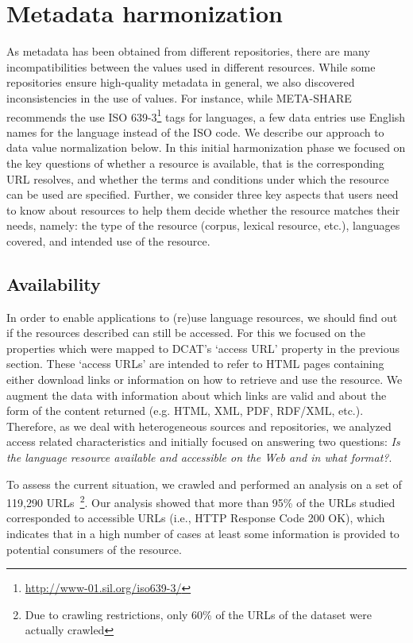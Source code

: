 \documentclass[11pt]{article}
\begin{document}
\section{Metadata harmonization}

\label{harmonization}

As metadata has been obtained from different repositories, there are many incompatibilities between the values used in different resources. 
While some repositories ensure high-quality metadata in general, we also
discovered inconsistencies in the use of values. For instance, while META-SHARE
recommends the use ISO 639-3\footnote{\url{http://www-01.sil.org/iso639-3/}} tags for
languages, a few data entries use English names for the language
instead of the ISO code. We describe our approach to data value normalization below. In this initial harmonization phase we focused on the key
questions of whether a resource is available, that is the corresponding URL resolves, and whether the terms and conditions under which the resource can be used are specified. Further, we consider three key aspects that users need to know about resources to help them decide whether the resource matches their needs, namely: the type of the resource (corpus, lexical resource, etc.), languages covered, and intended use of the resource.

\subsection{Availability}

In order to enable applications to (re)use language resources, we should find
out if the resources described can still be accessed. For this we focused on the
properties which were mapped to DCAT's `access URL' property in the previous
section. These `access URLs' are intended to refer to HTML pages
containing either download links or information on how to retrieve and use the
resource. We augment the data with information about which links are valid and about the form of the content returned (e.g. HTML, XML, PDF, RDF/XML, etc.).
Therefore, as we deal with heterogeneous sources and repositories, we 
analyzed access related characteristics and initially focused on answering two 
questions: \textit{Is the language resource available and accessible on the Web
and in what format?}.

To assess the current situation, we crawled and performed an analysis on a set of 
119,290 URLs~\footnote{Due to crawling restrictions, only 60\% of the URLs of the dataset were actually crawled}.
Our analysis showed that more than 95\% of the URLs
studied corresponded to accessible URLs (i.e., HTTP Response Code 200 OK), which
indicates that in a high number of cases at least some information is provided
to potential consumers of the resource.
\end{document}
